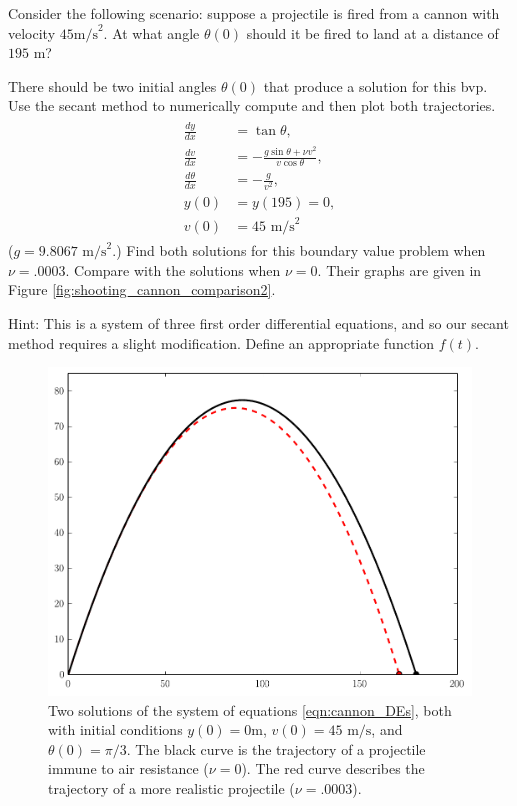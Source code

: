 \begin{problem}
Consider the following scenario: suppose a projectile is fired from a cannon with velocity $45\text{m/s}^2$.
At what angle $\theta(0)$ should it be fired to land at a distance of $195\text{ m}$? 

There should be two initial angles $\theta(0)$ that produce a solution for this bvp.
Use the secant method to numerically compute and then plot both trajectories.
\begin{align}
	\label{eqn:cannon_shooting}
	\begin{split}
\frac{dy}{dx} &= \tan {\theta} ,\\
\frac{dv}{dx} &= -\frac{g \sin{\theta} + \nu v^2}{v \cos{\theta}},\\
\frac{d\theta}{dx} &= -\frac{g}{v^2},\\
y(0)&= y(195) = 0,\\
v(0) &= 45 \text{ m/s}^2
	\end{split}
\end{align}
($g = 9.8067\text{ m/s}^2$.)
Find both solutions for this boundary value problem when $\nu = .0003$.
Compare with the solutions when $\nu = 0.$
Their graphs are given in Figure \ref{fig:shooting_cannon_comparison2}.

Hint: This is a system of three first order differential equations, and so our secant method requires a slight modification.
Define an appropriate function $f(t)$. 
\end{problem}

\begin{figure}
\includegraphics[width=\textwidth]{Cannon_with_AirResistance.pdf}
\caption{Two solutions of the system of equations \eqref{eqn:cannon_DEs}, both with initial conditions  $y(0) = 0 \text{m}$, $ v(0) = 45 \text{ m/s}$, and $\theta(0)=\pi/3$.
The black curve is the trajectory of a projectile immune to air resistance ($\nu = 0$).
The red curve describes the trajectory of a more realistic projectile ($\nu = .0003$).}
\label{fig:shooting_cannon_comparison1}
\end{figure}

